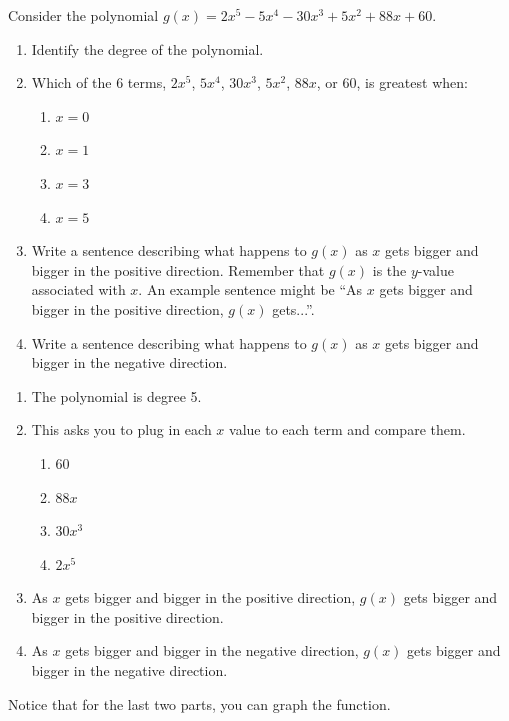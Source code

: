 \documentclass[noauthor]{ximera}
\begin{document}
\begin{problem}
Consider the polynomial \(g\left(x\right)=2x^5-5x^4-30x^3+5x^2+88x+60\).

\begin{enumerate}
    \item Identify the degree of the polynomial.
    \item Which of the 6 terms, \(2x^5\), \(5x^4\), \(30x^3\), \(5x^2\),
    \(88x\), or \(60\), is greatest when:
    \begin{enumerate}
        \item \(x = 0\)
        \item \(x = 1\)
        \item \(x = 3\)
        \item \(x = 5\)
    \end{enumerate}
    \item Write a sentence describing what happens to \(g\left(x\right)\) 
    as \(x\) gets bigger and bigger in the positive direction. 
    Remember that \(g(x)\) is the \(y\)-value associated with \(x\). 
    An example sentence might be ``As \(x\) gets bigger and bigger in 
    the positive direction, \(g(x)\) gets...''.
    \item Write a sentence describing what happens to \(g\left(x\right)\) 
    as \(x\) gets bigger and bigger in the negative direction. 
\end{enumerate}
\begin{explanation}
    \begin{enumerate}
        \item The polynomial is degree 5.
        \item This asks you to plug in each \(x\) value to each term and compare them.
        \begin{enumerate}
            \item 60
            \item \(88x\)
            \item \(30x^3\)
            \item \(2x^5\)
        \end{enumerate}
        \item As \(x\) gets bigger and bigger in the positive direction, \(g(x)\) gets bigger and bigger in the positive direction.
        \item As \(x\) gets bigger and bigger in the negative direction, \(g(x)\) gets bigger and bigger in the negative direction.
        
    \end{enumerate}

    Notice that for the last two parts, you can graph the function. 

\end{explanation}
\end{problem}
\end{document}
